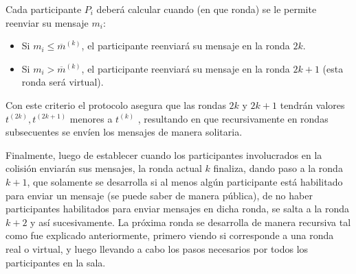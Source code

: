 Cada participante $P_i$ deberá calcular cuando (en que ronda) se le permite reenviar su mensaje $m_i$:
\begin{itemize}
    \item Si $m_i \leq \overline{m}^{(k)}$, el participante reenviará su mensaje en la ronda $2k$.
    \item Si $m_i > \overline{m}^{(k)}$, el participante reenviará su mensaje en la ronda $2k + 1$ 
    (esta ronda será virtual).
\end{itemize}

Con este criterio el protocolo asegura que las rondas $2k$ y $2k + 1$ tendrán valores 
$t^{(2k)}, t^{(2k + 1)}$ menores a $t^{(k)}$  , resultando en que recursivamente en rondas 
subsecuentes se envíen los mensajes de manera solitaria.

Finalmente, luego de establecer cuando los participantes involucrados en la colisión enviarán 
sus mensajes, la ronda actual $k$ finaliza, dando paso a la ronda $k+1$, que solamente se 
desarrolla si al menos algún participante está habilitado para enviar un mensaje (se puede 
saber de manera pública), de no haber participantes habilitados para enviar mensajes en dicha 
ronda, se salta a la ronda $k+2$ y así sucesivamente. La próxima ronda se desarrolla de manera 
recursiva tal como fue explicado anteriormente, primero viendo si corresponde a una ronda real 
o virtual, y luego llevando a cabo los pasos necesarios por todos los participantes en la sala.

